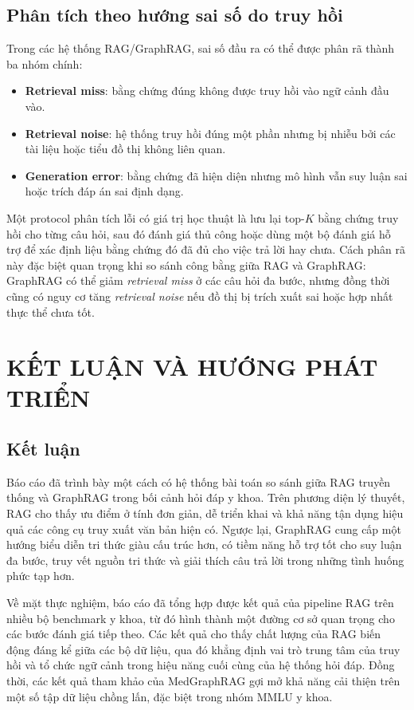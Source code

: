 \documentclass[a4paper,12pt,twoside]{report}
\begin{document}
\section{Phân tích theo hướng sai số do truy hồi}
Trong các hệ thống RAG/GraphRAG, sai số đầu ra có thể được phân rã thành ba nhóm chính:
\begin{itemize}[nosep]
  \item \textbf{Retrieval miss}: bằng chứng đúng không được truy hồi vào ngữ cảnh đầu vào.
  \item \textbf{Retrieval noise}: hệ thống truy hồi đúng một phần nhưng bị nhiễu bởi các tài liệu hoặc tiểu đồ thị không liên quan.
  \item \textbf{Generation error}: bằng chứng đã hiện diện nhưng mô hình vẫn suy luận sai hoặc trích đáp án sai định dạng.
\end{itemize}

Một protocol phân tích lỗi có giá trị học thuật là lưu lại top-\(K\) bằng chứng truy hồi cho từng câu hỏi, sau đó đánh giá thủ công hoặc dùng một bộ đánh giá hỗ trợ để xác định liệu bằng chứng đó đã đủ cho việc trả lời hay chưa. Cách phân rã này đặc biệt quan trọng khi so sánh công bằng giữa RAG và GraphRAG: GraphRAG có thể giảm \textit{retrieval miss} ở các câu hỏi đa bước, nhưng đồng thời cũng có nguy cơ tăng \textit{retrieval noise} nếu đồ thị bị trích xuất sai hoặc hợp nhất thực thể chưa tốt.

\chapter{KẾT LUẬN VÀ HƯỚNG PHÁT TRIỂN}
\label{chap:conclusion}

\section{Kết luận}
Báo cáo đã trình bày một cách có hệ thống bài toán so sánh giữa RAG truyền thống và GraphRAG trong bối cảnh hỏi đáp y khoa. Trên phương diện lý thuyết, RAG cho thấy ưu điểm ở tính đơn giản, dễ triển khai và khả năng tận dụng hiệu quả các công cụ truy xuất văn bản hiện có. Ngược lại, GraphRAG cung cấp một hướng biểu diễn tri thức giàu cấu trúc hơn, có tiềm năng hỗ trợ tốt cho suy luận đa bước, truy vết nguồn tri thức và giải thích câu trả lời trong những tình huống phức tạp hơn.

Về mặt thực nghiệm, báo cáo đã tổng hợp được kết quả của pipeline RAG trên nhiều bộ benchmark y khoa, từ đó hình thành một đường cơ sở quan trọng cho các bước đánh giá tiếp theo. Các kết quả cho thấy chất lượng của RAG biến động đáng kể giữa các bộ dữ liệu, qua đó khẳng định vai trò trung tâm của truy hồi và tổ chức ngữ cảnh trong hiệu năng cuối cùng của hệ thống hỏi đáp. Đồng thời, các kết quả tham khảo của MedGraphRAG gợi mở khả năng cải thiện trên một số tập dữ liệu chồng lấn, đặc biệt trong nhóm MMLU y khoa.
\end{document}
